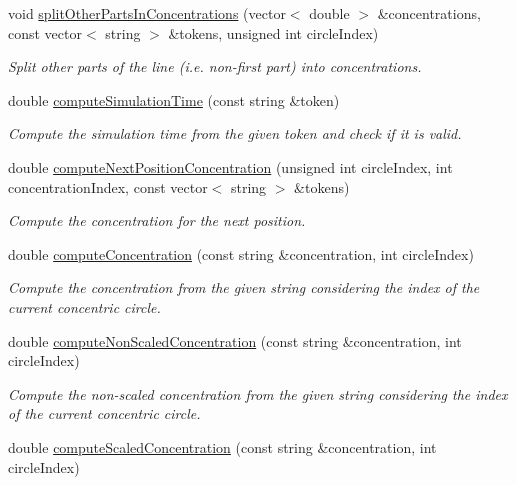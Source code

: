 \begin{DoxyCompactItemize}
void \hyperlink{classmultiscale_1_1video_1_1PolarCsvToInputFilesConverter_a84994d623303296509326707fa397f29}{split\-Other\-Parts\-In\-Concentrations} (vector$<$ double $>$ \&concentrations, const vector$<$ string $>$ \&tokens, unsigned int circle\-Index)
\begin{DoxyCompactList}\small\item\em Split other parts of the line (i.\-e. non-\/first part) into concentrations. \end{DoxyCompactList}\item 
double \hyperlink{classmultiscale_1_1video_1_1PolarCsvToInputFilesConverter_a3f811086d08d1665548af54e8bd50654}{compute\-Simulation\-Time} (const string \&token)
\begin{DoxyCompactList}\small\item\em Compute the simulation time from the given token and check if it is valid. \end{DoxyCompactList}\item 
double \hyperlink{classmultiscale_1_1video_1_1PolarCsvToInputFilesConverter_a393e66a46463bf557ccf318ddcf14d3a}{compute\-Next\-Position\-Concentration} (unsigned int circle\-Index, int concentration\-Index, const vector$<$ string $>$ \&tokens)
\begin{DoxyCompactList}\small\item\em Compute the concentration for the next position. \end{DoxyCompactList}\item 
double \hyperlink{classmultiscale_1_1video_1_1PolarCsvToInputFilesConverter_adec57e72f9f321cd9b36317b2aa3ac38}{compute\-Concentration} (const string \&concentration, int circle\-Index)
\begin{DoxyCompactList}\small\item\em Compute the concentration from the given string considering the index of the current concentric circle. \end{DoxyCompactList}\item 
double \hyperlink{classmultiscale_1_1video_1_1PolarCsvToInputFilesConverter_a3c9fd506cbe4d0881ed3c234492d2432}{compute\-Non\-Scaled\-Concentration} (const string \&concentration, int circle\-Index)
\begin{DoxyCompactList}\small\item\em Compute the non-\/scaled concentration from the given string considering the index of the current concentric circle. \end{DoxyCompactList}\item 
double \hyperlink{classmultiscale_1_1video_1_1PolarCsvToInputFilesConverter_adfaf1d1912fa6f511033ace081381ac8}{compute\-Scaled\-Concentration} (const string \&concentration, int circle\-Index)

\end{DoxyCompactItemize}
